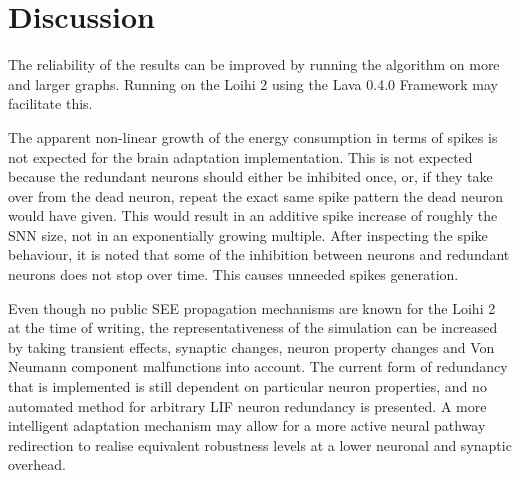
\vspace{-2em}\section{Discussion}\label{sec:discussion}
\vspace{-1em}
The reliability of the results can be improved by running the algorithm on more and larger graphs. Running on the Loihi 2 using the Lava 0.4.0 Framework may facilitate this. 

The apparent non-linear growth of the energy consumption in terms of spikes is not expected for the brain adaptation implementation. This is not expected because the redundant neurons should either be inhibited once, or, if they take over from the dead neuron, repeat the exact same spike pattern the dead neuron would have given. This would result in an additive spike increase of roughly the SNN size, not in an exponentially growing multiple. After inspecting the spike behaviour, it is noted that some of the inhibition between neurons and redundant neurons does not stop over time. This causes unneeded spikes generation.

Even though no public SEE propagation mechanisms are known for the Loihi 2 at the time of writing, the representativeness of the simulation can be increased by taking transient effects, synaptic changes, neuron property changes and Von Neumann component malfunctions into account. The current form of redundancy that is implemented is still dependent on particular neuron properties, and no automated method for arbitrary LIF neuron redundancy is presented. A more intelligent adaptation mechanism may allow for a more active neural pathway redirection to realise equivalent robustness levels at a lower neuronal and synaptic overhead. 

